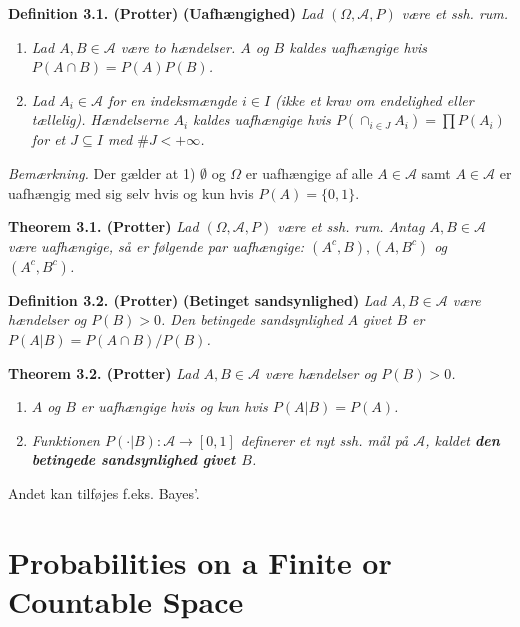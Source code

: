 \documentclass[a4paper,12pt,openany]{book}
\providecommand{\tightlist}{%
 \setlength{\itemsep}{0pt}\setlength{\parskip}{0pt}}
\begin{document}
\textbf{Definition 3.1. (Protter)} \textbf{(Uafhængighed)} \emph{Lad \((\Omega,\mathcal{A},P)\) være et ssh. rum.}

\begin{enumerate}
\def\labelenumi{\alph{enumi}.}
\tightlist
\item
  \emph{Lad \(A,B\in\mathcal{A}\) være to hændelser. \(A\) og \(B\) kaldes uafhængige hvis \(P(A\cap B)=P(A)P(B)\).}
\item
  \emph{Lad \(A_i\in\mathcal{A}\) for en indeksmængde \(i\in I\) (ikke et krav om endelighed eller tællelig). Hændelserne \(A_i\) kaldes uafhængige hvis \(P(\cap_{i\in J}A_i)=\prod P(A_i)\) for et \(J\subseteq I\) med \(\# J< +\infty\).}
\end{enumerate}

\emph{Bemærkning.} Der gælder at 1) \(\emptyset\) og \(\Omega\) er uafhængige af alle \(A\in\mathcal{A}\) samt \(A\in\mathcal{A}\) er uafhængig med sig selv hvis og kun hvis \(P(A)=\{0,1\}\).

\textbf{Theorem 3.1. (Protter)} \emph{Lad \((\Omega,\mathcal{A},P)\) være et ssh. rum. Antag \(A,B\in\mathcal{A}\) være uafhængige, så er følgende par uafhængige: \((A^c,B),(A,B^c)\) og \((A^c,B^c)\).}

\textbf{Definition 3.2. (Protter)} \textbf{(Betinget sandsynlighed)} \emph{Lad \(A,B\in\mathcal{A}\) være hændelser og \(P(B)>0\). Den betingede sandsynlighed \(A\) givet \(B\) er \(P(A\vert B)=P(A\cap B)/P(B)\).}

\textbf{Theorem 3.2. (Protter)} \emph{Lad \(A,B\in\mathcal{A}\) være hændelser og \(P(B)>0\).}

\begin{enumerate}
\def\labelenumi{\alph{enumi}.}
\tightlist
\item
  \emph{\(A\) og \(B\) er uafhængige hvis og kun hvis \(P(A\vert B)=P(A)\).}
\item
  \emph{Funktionen \(P(\cdot \vert B) : \mathcal{A} \to [0,1]\) definerer et nyt ssh. mål på \(\mathcal{A}\), kaldet \textbf{den betingede sandsynlighed givet \(B\)}.}
\end{enumerate}

Andet kan tilføjes f.eks. Bayes'.

\hypertarget{probabilities-on-a-finite-or-countable-space}{%
\section{Probabilities on a Finite or Countable Space}\label{probabilities-on-a-finite-or-countable-space}}
\end{document}

